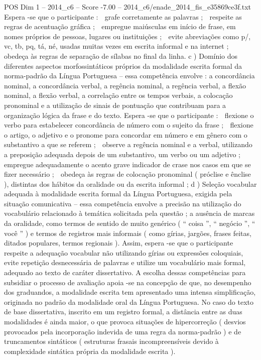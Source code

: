 \begin{textsample}{POS Dim 1 – 2014\_c6 – Score -7.00 – 2014\_c6/enade\_2014\_fis\_e35869ce3f.txt}
Espera -se que o participante :  grafe corretamente as palavras ;  respeite as regras de acentuação gráfica ;  empregue maiúsculas em início de frase, em nomes próprios de pessoas, lugares ou instituições ;  evite abreviações como p/, vc, tb, pq, tá, né, usadas muitas vezes em escrita informal e na internet ;  obedeça às regras de separação de sílabas no final da linha. c ) Domínio dos diferentes aspectos morfossintáticos próprios da modalidade escrita formal da norma-padrão da Língua Portuguesa – essa competência envolve : a concordância nominal, a concordância verbal, a regência nominal, a regência verbal, a flexão nominal, a flexão verbal, a correlação entre os tempos verbais, a colocação pronominal e a utilização de sinais de pontuação que contribuam para a organização lógica da frase e do texto.
Espera -se que o participante :  flexione o verbo para estabelecer concordância de número com o sujeito da frase ;  flexione o artigo, o adjetivo e o pronome para concordar em número e em gênero com o substantivo a que se referem ;  observe a regência nominal e a verbal, utilizando a preposição adequada depois de um substantivo, um verbo ou um adjetivo ;  empregue adequadamente o acento grave indicador de crase nos casos em que se fizer necessário ;  obedeça às regras de colocação pronominal ( próclise e ênclise ), distintas dos hábitos da oralidade ou da escrita informal ; d ) Seleção vocabular adequada à modalidade escrita formal da Língua Portuguesa, exigida pela situação comunicativa – essa competência envolve a precisão na utilização do vocabulário relacionado à temática solicitada pela questão ; a ausência de marcas da oralidade, como termos de sentido de muito genérico ( “ coisa ”, “ negócio ”, “ você ” ) e termos de registros mais informais ( como gírias, jargões, frases feitas, ditados populares, termos regionais ).
Assim, espera -se que o participante respeite a adequação vocabular não utilizando gírias ou expressões coloquiais, evite repetição desnecessária de palavras e utilize um vocabulário mais formal, adequado ao texto de caráter dissertativo.
A escolha dessas competências para subsidiar o processo de avaliação apoia -se na concepção de que, no desempenho dos graduandos, a modalidade escrita tem apresentado uma intensa simplificação, originada no padrão da modalidade oral da Língua Portuguesa.
No caso do texto de base dissertativa, inscrito em um registro formal, a distância entre as duas modalidades é ainda maior, o que provoca situações de hipercorreção ( desvios provocados pela incorporação indevida de uma regra da norma-padrão ) e de truncamentos sintáticos ( estruturas frasais incompreensíveis devido à complexidade sintática própria da modalidade escrita ).

\end{textsample}
